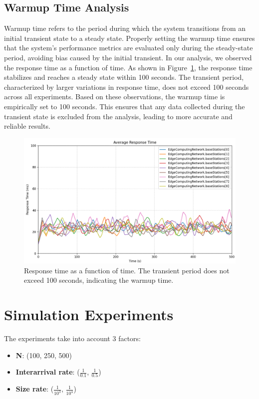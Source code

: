 \documentclass{report}
\begin{document}
\section{Warmup Time Analysis}
Warmup time refers to the period during which the system transitions from an initial transient state to a steady state. Properly setting the warmup time ensures that the system's performance metrics are evaluated only during the steady-state period, avoiding bias caused by the initial transient.
In our analysis, we observed the response time as a function of time. As shown in Figure~\ref{fig:warmup_time}, the response time stabilizes and reaches a steady state within 100 seconds.
The transient period, characterized by larger variations in response time, does not exceed 100 seconds across all experiments.
Based on these observations, the warmup time is empirically set to 100 seconds.
This ensures that any data collected during the transient state is excluded from the analysis, leading to more accurate and reliable results.

\begin{figure}[h!]
    \centering
    \includegraphics[width=1\textwidth]{img/warmup_analysis.png}
    \caption{Response time as a function of time. The transient period does not exceed 100 seconds, indicating the warmup time.}
    \label{fig:warmup_time}
\end{figure}

\chapter{Simulation Experiments}
The experiments take into account 3 factors:
\begin{itemize}
    \item \textbf{N}: (100, 250, 500)
    \item \textbf{Interarrival rate}: ($\frac{1}{0.1}$, $\frac{1}{0.5}$)
    \item \textbf{Size rate}: ($\frac{1}{10^3}$, $\frac{1}{10^4}$)
\end{itemize}
\end{document}
